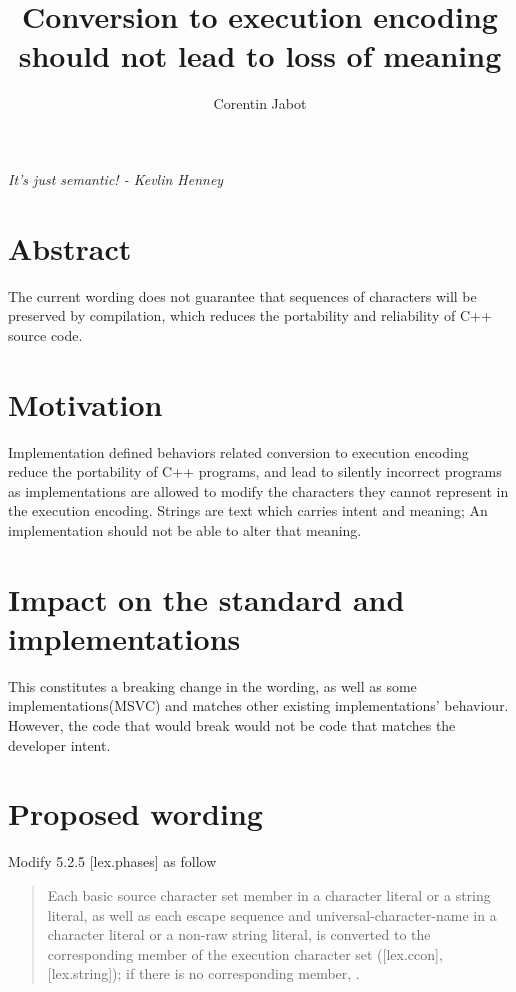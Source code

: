 \documentclass{wg21}
\title{Conversion to execution encoding should not lead to loss of meaning}
\author{Corentin Jabot}{corentin.jabot@gmail.com}
\begin{document}
\maketitle

\begin{flushright}
	\hfill \break
	\hfill \break
	\textit{It's just semantic! - Kevlin Henney}
\end{flushright}


\section{Abstract}

The current wording does not guarantee that sequences of characters will be preserved by compilation, which reduces the portability and reliability of
C++ source code.  

\section{Motivation}

Implementation defined behaviors related conversion to execution encoding reduce the portability of C++ programs, and lead to silently incorrect
programs as implementations are allowed to modify the characters they cannot represent in the execution encoding.
Strings are text which carries intent and meaning;  An implementation should not be able to alter that meaning.

\section{Impact on the standard and implementations}

This constitutes a breaking change in the wording, as well as some implementations(MSVC) and matches other existing implementations' behaviour.
However, the code that would break would not be code that matches the developer intent. 

\section{Proposed wording}


Modify 5.2.5 [lex.phases] as follow

\begin{quote}

Each basic source character set member in a character literal or a string literal, as well as each escape sequence and universal-character-name in a character literal or a non-raw string literal, is converted to the corresponding member of the execution character set ([lex.ccon], [lex.string]); if there is no corresponding member, .

\end{quote}
\end{document}
